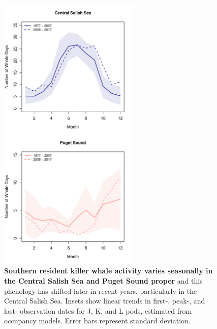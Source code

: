 \documentclass{article}
\begin{document}
\begin{figure}[p]
\includegraphics[width=0.6\textwidth]{../analyses/figures/OrcaPhenPlots/wdays_bymonth_earlylate_1976_assumeSRKW2regs.pdf} 
\caption{\textbf{Southern resident killer whale activity varies seasonally in the Central Salish Sea and Puget Sound proper} and this phenology has shifted later in recent years, particularly in the Central Salish Sea. Insets show linear trends in first-, peak-, and last- observation dates for J, K, and L pods, estimated from occupancy models. Error bars represent standard deviation.}
\label{fig:phenplot}
 \end{figure}
\end{document}
